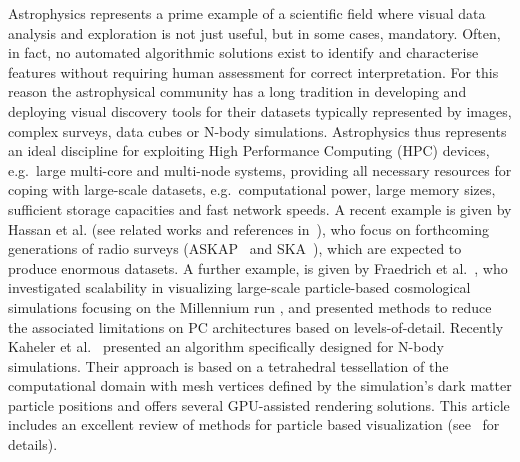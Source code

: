 \documentclass[smallextended]{svjour3}
\begin{document}
Astrophysics represents a prime example of a scientific field where visual data analysis and exploration is not just useful, but in some cases, mandatory. Often, in fact, no automated algorithmic solutions exist to identify and characterise features without requiring human assessment for correct interpretation. For this reason the astrophysical community has a long tradition in developing and deploying visual discovery tools for their datasets typically represented by images, complex surveys, data cubes or N-body simulations. Astrophysics thus represents an ideal discipline for exploiting High Performance Computing (HPC) devices, e.g.\ large multi-core and multi-node systems, providing all necessary resources for coping with large-scale datasets, e.g.\ computational power, large memory sizes, sufficient storage capacities and fast network speeds. A recent example is given by Hassan et al. (see related works and references in~\cite{2012ASPC..461...45H}), who focus on forthcoming generations of radio surveys (ASKAP~\cite{askap} and SKA~\cite{ska}), which are expected to produce enormous datasets. A further example, is given by Fraedrich et al.~\cite{Fraedrich:2009:TMV}, who
investigated scalability in visualizing large-scale particle-based cosmological 
simulations focusing on the Millennium run \cite{millennium}, and presented methods to reduce the associated limitations on PC architectures based on levels-of-detail.
Recently Kaheler et al.~\cite{2012arXiv1208.3206K} presented an algorithm specifically designed for N-body simulations. Their approach is based on a tetrahedral tessellation of the computational domain with mesh vertices defined by the simulation's dark matter particle positions and offers several GPU-assisted rendering solutions. This article includes an excellent review of methods for particle based visualization (see~\cite{2012arXiv1208.3206K} for details).
\end{document}
